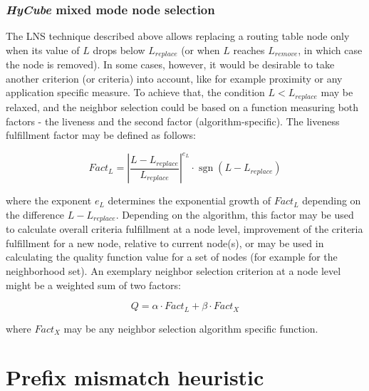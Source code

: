 \subsubsection{\emph{HyCube} mixed mode node selection}

The LNS technique described above allows replacing a routing table node only when its value of $L$ drops below $L_{replace}$ (or when $L$ reaches $L_{remove}$, in which case the node is removed). In some cases, however, it would be desirable to take another criterion (or criteria) into account, like for example proximity or any application specific measure. To achieve that, the condition $L < L_{replace}$ may be relaxed, and the neighbor selection could be based on a function measuring both factors - the liveness and the second factor (algorithm-specific). The liveness fulfillment factor may be defined as follows:

\begin{equation}
	Fact_{L} = \left|\frac{L - L_{replace}}{L_{replace}}\right|^{e_L} \cdot \mathop{\mathrm{sgn}}(L - L_{replace})
\end{equation}

\noindent
where the exponent $e_L$ determines the exponential growth of $Fact_{L}$ depending on the difference $L - L_{replace}$. Depending on the algorithm, this factor may be used to calculate overall criteria fulfillment at a node level, improvement of the criteria fulfillment for a new node, relative to current node(s), or may be used in calculating the quality function value for a set of nodes (for example for the neighborhood set). An exemplary neighbor selection criterion at a node level might be a weighted sum of two factors:

\begin{equation}
	Q = \alpha \cdot Fact_{L} + \beta \cdot Fact_{X}
\end{equation}

\noindent
where $Fact_{X}$ may be any neighbor selection algorithm specific function.







\section{Prefix mismatch heuristic}
\label{sec:pmh}

